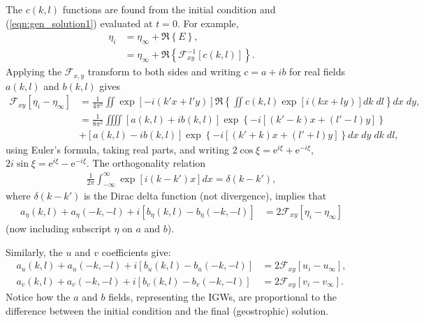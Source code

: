 \documentclass[10pt,reqno]{amsart}
\newcommand{\expe}{{\mathrm e}}
\begin{document}
The $c(k,l)$ functions are found from the initial condition and (\ref{eqn:gen_solution1}) evaluated at $t=0$.
For example,
\begin{align}
\eta_i & = \eta_{\infty} + \Re \left\{ E \right\} , \label{eqn:inf_plane_eta_i}  \\
& = \eta_{\infty} + \Re \left\{ {\mathcal F}^{-1}_{xy} \left[ c (k,l)  \right]  \right\} .  
\end{align}
Applying the ${\mathcal F}_{x,y}$ transform to both sides and writing $c = a + i b$ for real fields $a (k,l)$ and $b (k,l)$ gives
\begin{align}
{\mathcal F}_{xy} \left[ \eta_i  - \eta_{\infty} \right] & = \frac{1}{4 \pi^2} \iint \exp \left[ - i \left( k' x + l' y \right)\right] 
\Re \left\{ \iint c(k,l) \exp \left[ i \left( k x + l y \right) \right] dk \;dl
\right\} dx \; dy ,  \label{eq:Fourier_detail} \\
& = \frac{1}{8 \pi^2}
\iiiint
\left[ a(k,l) + i b (k,l)\right]  \exp \left\{ - i \left[ \left( k' - k \right) x + \left(l' - l \right) y \right] \right\}   \\
&+ 
\left[ a(k,l) - i b (k,l) \right] \exp \left\{ - i \left[ \left( k' + k \right) x + \left(l' + l \right) y \right] \right\}
dx \; dy \; dk \; dl,   
\end{align}
using Euler's formula, taking real parts, and writing $2 \cos \xi = \expe^{i \xi} + \expe^{-i \xi}$, $ 2 i \sin \xi = \expe^{i \xi} - \expe^{-i \xi}$.
The orthogonality relation
\begin{align}
\frac{1}{2 \pi} \int _{-\infty}^{\infty} \exp \left[ i (k - k') x \right] dx = \delta \left( k - k' \right) ,  
\end{align}
where $\delta( k - k' )$ is the Dirac delta function (not divergence), implies that
\begin{align}
a_\eta (k,l) + a_\eta (-k,-l) + i \left[ b_\eta (k,l) - b_\eta (-k,-l) \right] & =  2 {\mathcal F}_{xy} \left[ \eta_i  - \eta_{\infty} \right]
\label{eqn:eta_coeffs_inf_plane}
\end{align}
(now including subscript $\eta$ on $a$ and $b$).

Similarly, the $u$ and $v$ coefficients give:
\begin{align}
a_u(k,l) + a_u (-k,-l)  + i \left[ b_u (k,l) - b_u (-k,-l) \right] & = 2 {\mathcal F}_{xy} \left[ u_i  - u_{\infty} \right] ,   \\
a_v(k,l) + a_v (-k,-l)  + i \left[ b_v (k,l) - b_v (-k,-l) \right] & = 2 {\mathcal F}_{xy} \left[ v_i  - v_{\infty} \right] .
\end{align}
Notice how the $a$ and $b$ fields, representing the IGWs, are proportional to the difference between the initial condition and the final (geostrophic) solution.
\end{document}
